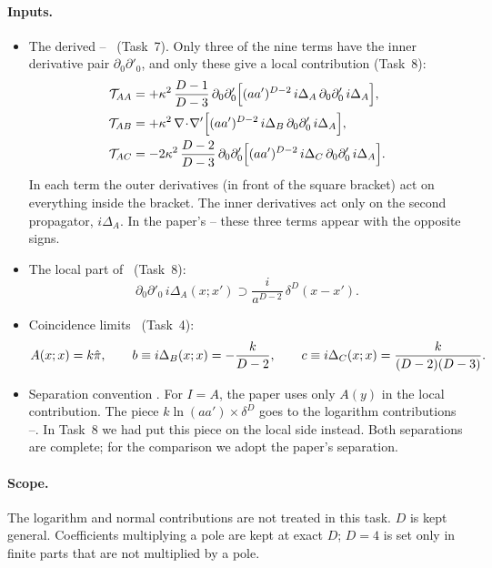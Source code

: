 \paragraph{Inputs.}
\begin{itemize}[leftmargin=1.2em,itemsep=3pt]
\item[(G1)] The derived -- \tD\ (Task~7).
Only three of the nine terms have the inner derivative pair $\partial_0\partial'_0$, and only these give a local contribution (Task~8):
\begin{equation}
\begin{aligned}
\mathcal{T}_{AA}&=+\kappa^2\,\frac{D-1}{D-3}\,\partial_0\partial'_0\Big[(aa')^{D-2}\,i\Delta_A\,\partial_0\partial'_0\,i\Delta_A\Big],\\
\mathcal{T}_{AB}&=+\kappa^2\,\nabla\!\cdot\!\nabla'\Big[(aa')^{D-2}\,i\Delta_B\,\partial_0\partial'_0\,i\Delta_A\Big],\\
\mathcal{T}_{AC}&=-2\kappa^2\,\frac{D-2}{D-3}\,\partial_0\partial'_0\Big[(aa')^{D-2}\,i\Delta_C\,\partial_0\partial'_0\,i\Delta_A\Big].
\end{aligned}
\label{eq:ch04:G1t9}
\end{equation}
In each term the outer derivatives (in front of the square bracket) act on everything inside the bracket.
The inner derivatives act only on the second propagator, $i\Delta_A$.
In the paper's -- these three terms appear with the opposite signs.
\item[(G2)] The local part of  \tD\ (Task~8):
\begin{equation}
\partial_0\partial'_0\,i\Delta_A(x;x')\supset\frac{i}{a^{D-2}}\,\delta^D(x-x').
\label{eq:ch04:G2t9}
\end{equation}
\item[(G3)] Coincidence limits \tD\ (Task~4):
\begin{equation}
A(x;x)=k\hat\pi,\qquad b\equiv i\Delta_B(x;x)=-\frac{k}{D-2},\qquad c\equiv i\Delta_C(x;x)=\frac{k}{(D-2)(D-3)}.
\label{eq:ch04:G3t9}
\end{equation}
\item[(G4)] Separation convention \tP.
For $I=A$, the paper uses only $A(y)$ in the local contribution.
The piece $k\ln(aa')\times\delta^D$ goes to the logarithm contributions --.
In Task~8 we had put this piece on the local side instead.
Both separations are complete; for the comparison we adopt the paper's separation.
\end{itemize}

\paragraph{Scope.}
The logarithm and normal contributions are not treated in this task.
$D$ is kept general.
Coefficients multiplying a pole are kept at exact $D$; $D=4$ is set only in finite parts that are not multiplied by a pole.

